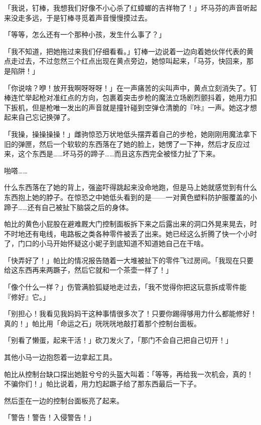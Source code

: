 「我说，钉棒，我想我们好像不小心杀了红蟑螂的吉祥物了！」坏马芬的声音听起来没走多远，于是钉棒寻觅着声音慢慢摸过去。

「等等，怎么还有一个那种小孩，发生什么事了？」

「我不知道，把她拖过来我们仔细看看。」钉棒一边说着一边向着她伙伴代表的黄点走过去，不过忽然三个红点出现在黄点旁边，她惊叫起来，「马芬，快回来，那是陷阱！」

「你说啥？咿！放开我啊呀呀呀！」在一声痛苦的尖叫声中，黄点立刻消失了。钉棒连忙举起枪对准红点的方向，包裹着突击步枪的魔法立场剧烈颤抖着，她用力扣下扳机，但是枪唯一发出的声音就是撞针碰到空弹仓清脆的『咔』一声。她这才想起来自己忘记换弹了。

「我操，操操操操！」雌驹惊恐万状地低头摆弄着自己的步枪，她刚刚用魔法拿下旧的弹匣，然后一个软软的东西落在了她的脸上，她愣了一下神，然后才反应过来，这个东西是……坏马芬的蹄子……而且这东西完全被怪力扯了下来。

啪嗒……{}

什么东西落在了她的背上，强盗吓得跳起来没命地跑，但是马上她就感觉到有什么东西抱上她的脖子。在惊恐之中她低头看到的是——一对黄色塑料防护服覆盖的小蹄子……还有自己被扯下脑袋之后的身体。

\horizonline


帕比的黄色小屁股在避难厩大门控制面板拆下来之后露出来的洞口外晃来晃去，时不时地还有电线，电路板之类各种零件被丢了出来。她已经这么折腾了快一个小时了，门口的小马开始怀疑这小妮子到底知道不知道她自己在干啥。

「快弄好了！」帕比的情况报告随着一大堆被扯下的零件飞过房间。「我现在只要给这东西再来两蹶子，然后它就和一个茶壶一样了！」

「像个什么一样？」伤管满脸狐疑地走过去，「我不觉得你把这玩意拆成零件能『修好』它。」

「别担心！我看见我妈妈干这种事情很多次了！只要你踢得够用力什么都能修好！真的！」帕比用「命运之石」咣咣咣地敲打着那个控制台面板。

「别看了懒蛋，起来干活！」砍刀发火了，「那门不会自己把自己切开！」

其他小马一边抱怨着一边拿起工具。

帕比从控制台缺口探出她脏兮兮的头盔大叫着：「等等，再给我一次机会，真的！不骗你们！」帕比说着，用力尥起蹶子给了那东西最后一下子。

然后歪在一边的控制台面板亮了起来。

「{\mt 警告！警告！入侵警告！}」

